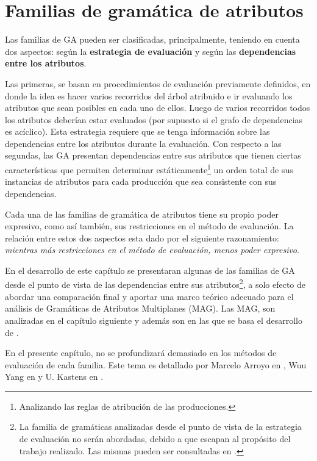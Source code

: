 \chapter{Familias de gramática de atributos}
\label{chap:clas_ag}
\minitoc

Las familias de GA pueden ser clasificadas, principalmente, teniendo en cuenta dos aspectos: según la \textbf{estrategia de evaluación} y según las \textbf{dependencias entre los atributos}. 

Las primeras, se basan en procedimientos de evaluación previamente definidos, en donde la idea es hacer varios recorridos del árbol atribuido e ir evaluando los atributos que sean posibles en cada uno de ellos. Luego de varios recorridos todos los atributos deberían estar evaluados (por supuesto si el grafo de dependencias es acíclico). Esta estrategia requiere que se tenga información sobre las dependencias entre los atributos durante la evaluación. Con respecto a las segundas, las GA presentan dependencias entre sus atributos que tienen ciertas características que permiten determinar estáticamente\footnote{Analizando las reglas de atribución de las producciones.} un orden total de sus instancias de atributos para cada producción que sea consistente con sus dependencias. 

Cada una de las familias de gramática de atributos tiene su propio poder expresivo, como así también, sus restricciones en el método de evaluación. La relación entre estos dos aspectos esta dado por el siguiente razonamiento: \textit{mientras más restricciones en el método de evaluación, menos poder expresivo}.

En el desarrollo de este capítulo se presentaran algunas de las familias de GA desde el punto de vista de las dependencias entre sus atributos\footnote{La familia de gramáticas analizadas desde el punto de vista de la estrategia de evaluación no serán abordadas, debido a que escapan al propósito del trabajo realizado. Las mismas pueden ser consultadas en \cite{tesismarcelo}.}, a solo efecto de abordar una comparación final y aportar una marco teórico adecuado para el análisis de Gramáticas de Atributos Multiplanes (MAG). Las MAG, son analizadas en el capítulo siguiente y además son en las que se basa el desarrollo de \maggen. 

En el presente capítulo, no se profundizará demasiado en los métodos de evaluación de cada familia. Este tema es detallado por Marcelo Arroyo en \cite{tesismarcelo}, Wuu Yang en \cite{wuu-yang2} y U. Kastens en \cite{kastens}.

